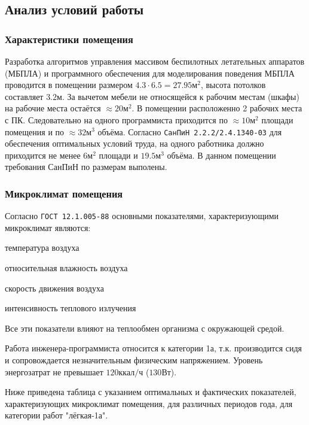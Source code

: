 \subsection{Анализ условий работы}

\subsubsection{Характеристики помещения}

Разработка алгоритмов управления массивом беспилотных летательных аппаратов (МБПЛА)
и программного обеспечения для моделирования поведения МБПЛА проводится в помещении
размером $4.3 \cdot 6.5 = 27.95 \text{м}^2$, высота потолков составляет $3.2 \text{м}$.
За вычетом мебели не относящейся к рабочим местам (шкафы) на рабочие места
остаётся $\approx 20 \text{м}^2$. В помещении расположенно 2 рабочих места с ПК.
Следовательно на одного программиста приходится по $\approx 10 \text{м}^2$
площади помещения \lb и по $\approx 32 \text{м}^3$ объёма. Согласно \verb|СанПиН 2.2.2/2.4.1340-03| для
обеспечения оптимальных условий труда, на одного работника должно приходится не менее
$6 \text{м}^2$ площади и $19.5 \text{м}^3$ объёма. В данном помещении требования
СанПиН по размерам выполены.

\subsubsection{Микроклимат помещения}

Согласно \verb|ГОСТ 12.1.005-88| основными показателями,
характеризующими микроклимат являются:
\begin{mintemize}
\item температура воздуха
\item относительная влажность воздуха
\item скорость движения воздуха
\item интенсивность теплового излучения
\end{mintemize}
Все эти показатели влияют на теплообмен организма с окружающей средой.

Работа инженера-программиста относится к категории 1а, т.к. производится
сидя и сопровождается незначительным физическим напряжением. Уровень
энергозатрат не превышает $120 {\text{ккал}}/{\text{ч}}$ ($130 \text{Вт}$).

Ниже приведена таблица с указанием оптимальных и фактических показателей,
характеризующих микроклимат помещения, для различных периодов года,
для категории работ "лёгкая-1а".

